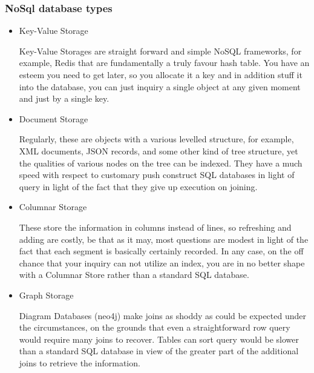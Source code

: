 \subsubsection{NoSql database types}

\begin{itemize}
\item Key-Value Storage \par
Key-Value Storages are straight forward and simple NoSQL frameworks, for example, Redis that are fundamentally a truly favour hash table. You have an esteem you need to get later, so you allocate it a key and in addition stuff it into the database, you can just inquiry a single object at any given moment and just by a single key.

\item Document Storage \par
Regularly, these are objects with a various levelled structure, for example, XML documents, JSON records, and some other kind of tree structure, yet the qualities of various nodes on the tree can be indexed. They have a much speed with respect to customary push construct SQL databases in light of query in light of the fact that they give up execution on joining. 

\item Columnar Storage  \par
These store the information in columns instead of lines, so refreshing and adding are costly, be that as it may, most questions are modest in light of the fact that each segment is basically certainly recorded. In any case, on the off chance that your inquiry can not utilize an index, you are in no better shape with a Columnar Store rather than a standard SQL database.

\item Graph Storage  \par
Diagram Databases (neo4j) make joins as shoddy as could be expected under the circumstances, on the grounds that even a straightforward row query would require many joins to recover. Tables can sort query would be slower than a standard SQL database in view of the greater part of the additional joins to retrieve the information. \cite{DataTypes}
\end{itemize}

